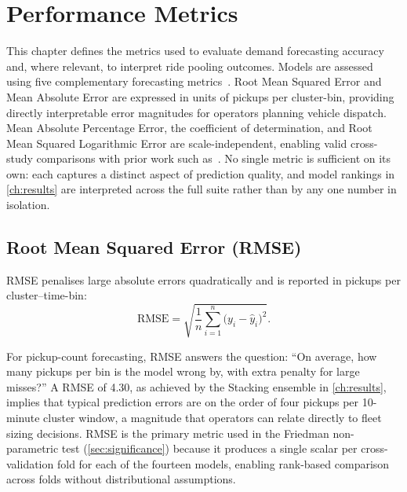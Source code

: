 \chapter{Performance Metrics}
\label{ch:metrics}
\label{sec:metrics}

This chapter defines the metrics used to evaluate demand forecasting accuracy and, where relevant, to interpret ride pooling outcomes. Models are assessed using five complementary forecasting metrics~\parencite{scikit-learn}. Root Mean Squared Error and Mean Absolute Error are expressed in units of pickups per cluster-bin, providing directly interpretable error magnitudes for operators planning vehicle dispatch. Mean Absolute Percentage Error, the coefficient of determination, and Root Mean Squared Logarithmic Error are scale-independent, enabling valid cross-study comparisons with prior work such as~\parencite{kim2020hybrid,xu2017realtime,liu2021epidemic}. No single metric is sufficient on its own: each captures a distinct aspect of prediction quality, and model rankings in \autoref{ch:results} are interpreted across the full suite rather than by any one number in isolation.

\section{Root Mean Squared Error (RMSE)}

RMSE penalises large absolute errors quadratically and is reported in pickups per cluster--time-bin:
\begin{equation}
 \text{RMSE} = \sqrt{\frac{1}{n}\sum_{i=1}^n \bigl(y_i - \hat{y}_i\bigr)^2}.
 \label{eq:rmse}
\end{equation}

For pickup-count forecasting, RMSE answers the question: ``On average, how many pickups per bin is the model wrong by, with extra penalty for large misses?'' A RMSE of 4.30, as achieved by the Stacking ensemble in \autoref{ch:results}, implies that typical prediction errors are on the order of four pickups per 10-minute cluster window, a magnitude that operators can relate directly to fleet sizing decisions. RMSE is the primary metric used in the Friedman non-parametric test (\autoref{sec:significance}) because it produces a single scalar per cross-validation fold for each of the fourteen models, enabling rank-based comparison across folds without distributional assumptions.

